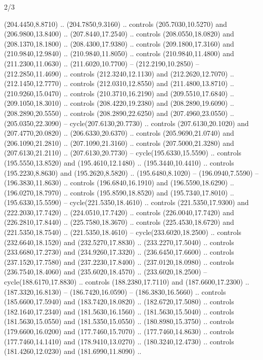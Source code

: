 \begin{flagdescription}{2/3}
\begin{scope}[xshift=0.5\flaglength,yshift=0.5\flagwidth,scale=\stretchfactor]
\begin{scope}[scale=0.001645\flagwidth,yshift=65mm,xshift=-63mm]
\begin{scope}[y=0.80pt, x=0.80pt, yscale=-1,]
\begin{scope}[cm={{1.33333,0.0,0.0,1.33333,(0.0,1e-05)}}]
  (204.4450,8.8710) .. (204.7850,9.3160) .. controls (205.7030,10.5270) and
  (206.9800,13.8400) .. (207.8440,17.2540) .. controls (208.0550,18.0820) and
  (208.1370,18.1800) .. (208.4300,17.9380) .. controls (209.1800,17.3160) and
  (210.9840,12.9840) .. (210.9840,11.8050) .. controls (210.9840,11.4800) and
  (211.2300,11.0630) .. (211.6020,10.7700) -- (212.2190,10.2850) --
  (212.2850,11.4690) .. controls (212.3240,12.1130) and (212.2620,12.7070) ..
  (212.1450,12.7770) .. controls (212.0310,12.8550) and (211.4800,13.8710) ..
  (210.9260,15.0470) .. controls (210.3710,16.2190) and (209.5510,17.6840) ..
  (209.1050,18.3010) .. controls (208.4220,19.2380) and (208.2890,19.6090) ..
  (208.2890,20.5550) .. controls (208.2890,22.6250) and (207.4960,23.0550) ..
  (205.0350,22.3090) -- cycle(207.6130,20.7730) .. controls (207.6130,20.1020)
  and (207.4770,20.0820) .. (206.6330,20.6370) .. controls (205.9690,21.0740)
  and (206.1090,21.2810) .. (207.1090,21.3160) .. controls (207.5000,21.3280)
  and (207.6130,21.2110) .. (207.6130,20.7730) -- cycle(195.6330,15.5590) ..
  controls (195.5550,13.8520) and (195.4610,12.1480) .. (195.3440,10.4410) ..
  controls (195.2230,8.8630) and (195.2620,8.5820) .. (195.6480,8.1020) --
  (196.0940,7.5590) -- (196.3830,11.8630) .. controls (196.6840,16.1910) and
  (196.5590,18.6290) .. (196.0270,18.7970) .. controls (195.8590,18.8520) and
  (195.7340,17.8010) .. (195.6330,15.5590) -- cycle(221.5350,18.4610) ..
  controls (221.5350,17.9300) and (222.2030,17.7420) .. (224.0510,17.7420) ..
  controls (226.0040,17.7420) and (226.2810,17.8440) .. (225.7580,18.3670) ..
  controls (225.4530,18.6720) and (221.5350,18.7540) .. (221.5350,18.4610) --
  cycle(233.6020,18.2500) .. controls (232.6640,18.1520) and (232.5270,17.8830)
  .. (233.2270,17.5040) .. controls (233.6680,17.2730) and (234.9260,17.3320) ..
  (236.6450,17.6600) .. controls (237.1520,17.7580) and (237.2230,17.8400) ..
  (237.0120,18.0980) .. controls (236.7540,18.4060) and (235.6020,18.4570) ..
  (233.6020,18.2500) -- cycle(188.6170,17.8830) .. controls (188.2380,17.7110)
  and (187.6600,17.2300) .. (187.3320,16.8130) -- (186.7420,16.0590) --
  (186.3830,16.5660) .. controls (185.6600,17.5940) and (183.7420,18.0820) ..
  (182.6720,17.5080) .. controls (182.1640,17.2340) and (181.5630,16.1560) ..
  (181.5630,15.5040) .. controls (181.5630,15.0550) and (181.5350,15.0550) ..
  (180.8980,15.3750) .. controls (179.6600,16.0200) and (177.7460,15.7070) ..
  (177.7460,14.8630) .. controls (177.7460,14.1410) and (178.9410,13.0270) ..
  (180.3240,12.4730) .. controls (181.4260,12.0230) and (181.6990,11.8090) ..

\end{scope}
\end{scope}
\end{scope}
\end{scope}
\end{flagdescription}
